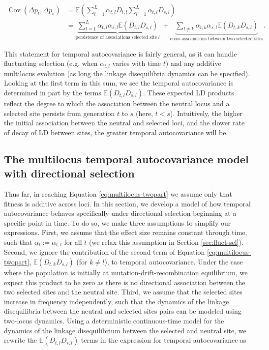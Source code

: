 \documentclass[11pt]{article}
\newcommand{\nnn}{\nonumber}
\newcommand{\E}{\mathbb{E}}
\DeclareMathOperator{\cov}{Cov}
\begin{document}
\begin{align}
  \cov(\Delta p_t, \Delta p_s) &=  \E \left(\sum_{l=1}^L \alpha_{t,l} D_{t,l} \sum_{l=1}^L \alpha_{t,l} D_{s,l} \right) \nnn \\ 
                               &=  \underbrace{\sum_{l=1}^L \alpha_{t,l} \alpha_{s,l} \E(D_{t,l}  D_{s,l})}_{\text{persistence of associations selected site} \; l}  \; + 
  \underbrace{\sum_{l \ne k} \alpha_{t,k} \alpha_{s,l}\E(D_{t,k}  D_{s,l})}_{\text{cross-associations between two selected sites}}. \label{eq:multilocus-twopart}
\end{align}

This statement for temporal autocovariance is fairly general, as it can handle
fluctuating selection (e.g. when $\alpha_{t,l}$ varies with time $t$) and any
additive multilocus evolution (as long the linkage disequilibria dynamics can
be specified). Looking at the first term in this sum, we see the temporal
autocovariance is determined in part by the terms $\E(D_{t,l} D_{s,l})$. These
expected LD products reflect the degree to which the association between the
neutral locus and a selected site persists from generation $t$ to $s$ (here, $t
< s$). Intuitively, the higher the initial association between the neutral and
selected loci, and the slower rate of decay of LD between sites, the greater
temporal autocovariance will be.

\subsection{The multilocus temporal autocovariance model with directional selection}
\label{sec:temp-autocov-dirsel}

Thus far, in reaching Equation \eqref{eq:multilocus-twopart} we assume only
that fitness is additive across loci. In this section, we develop a model of
how temporal autocovariance behaves specifically under directional selection
beginning at a specific point in time. To do so, we make three assumptions to
simplify our expressions. First, we assume that the effect size remains
constant through time, such that $\alpha_l := \alpha_{t,l}$ for all $t$ (we
relax this assumption in Section \ref{sec:fluct-sel}). Second, we ignore the
contribution of the second term of Equation \eqref{eq:multilocus-twopart},
$\E(D_{t,k} D_{s,l})$ (for $k \ne l$), to temporal autocovariance. Under the
case where the population is initially at mutation-drift-recombination
equilibrium, we expect this product to be zero as there is no directional
association between the two selected sites and the neutral site. Third, we
assume that the selected sites increase in frequency independently, such that
the dynamics of the linkage disequilibria between the neutral and selected
sites pairs can be modeled using two-locus dynamics. Using a deterministic
continuous-time model for the dynamics of the linkage disequilibrium between
the selected and neutral site, we rewrite the $\E(D_{t,l} D_{s,l})$ terms in
the expression for temporal autocovariance as
\end{document}
